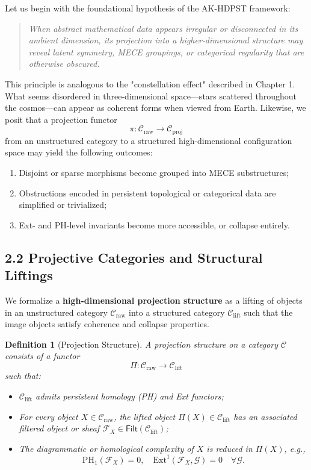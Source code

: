 \documentclass[11pt]{article}
\newtheorem{definition}[theorem]{Definition}
\begin{document}
Let us begin with the foundational hypothesis of the AK-HDPST framework:

\begin{quote}
\textit{
When abstract mathematical data appears irregular or disconnected in its ambient dimension,  
its projection into a higher-dimensional structure may reveal latent symmetry, MECE groupings,  
or categorical regularity that are otherwise obscured.
}
\end{quote}

This principle is analogous to the "constellation effect" described in Chapter 1.  
What seems disordered in three-dimensional space—stars scattered throughout the cosmos—can appear as coherent forms when viewed from Earth.  
Likewise, we posit that a projection functor  
\[
\pi : \mathcal{C}_{\text{raw}} \longrightarrow \mathcal{C}_{\text{proj}}
\]
from an unstructured category to a structured high-dimensional configuration space  
may yield the following outcomes:

\begin{enumerate}
  \item Disjoint or sparse morphisms become grouped into MECE substructures;
  \item Obstructions encoded in persistent topological or categorical data are simplified or trivialized;
  \item Ext- and PH-level invariants become more accessible, or collapse entirely.
\end{enumerate}

\subsection*{2.2 Projective Categories and Structural Liftings}

We formalize a \textbf{high-dimensional projection structure} as a lifting of objects in an unstructured category \( \mathcal{C}_{\text{raw}} \)  
into a structured category \( \mathcal{C}_{\text{lift}} \) such that the image objects satisfy coherence and collapse properties.

\begin{definition}[Projection Structure]
A projection structure on a category \( \mathcal{C} \) consists of a functor
\[
\Pi : \mathcal{C}_{\text{raw}} \to \mathcal{C}_{\text{lift}}
\]
such that:
\begin{itemize}
  \item \( \mathcal{C}_{\text{lift}} \) admits persistent homology (PH) and Ext functors;
  \item For every object \( X \in \mathcal{C}_{\text{raw}} \), the lifted object \( \Pi(X) \in \mathcal{C}_{\text{lift}} \)  
        has an associated filtered object or sheaf \( \mathcal{F}_X \in \mathsf{Filt}(\mathcal{C}_{\text{lift}}) \);
  \item The diagrammatic or homological complexity of \( X \) is reduced in \( \Pi(X) \), e.g.,
        \[
        \mathrm{PH}_1(\mathcal{F}_X) = 0, \quad \mathrm{Ext}^1(\mathcal{F}_X, \mathcal{G}) = 0 \quad \forall \mathcal{G}.
        \]
\end{itemize}
\end{definition}
\end{document}
